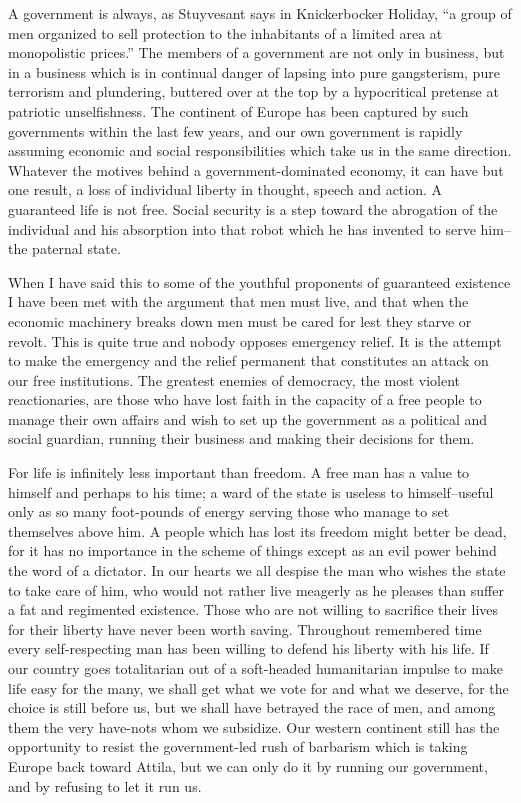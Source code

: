 \documentclass[9pt,twoside]{extarticle}
\begin{document}
A government is always, as Stuyvesant says in Knickerbocker Holiday, ``a group of men organized to sell protection to the inhabitants of a limited area at monopolistic prices.'' The members of a government are not only in business, but in a business which is in continual danger of lapsing into pure gangsterism, pure terrorism and plundering, buttered over at the top by a hypocritical pretense at patriotic unselfishness. The continent of Europe has been captured by such governments within the last few years, and our own government is rapidly assuming economic and social responsibilities which take us in the same direction. Whatever the motives behind a government-dominated economy, it can have but one result, a loss of individual liberty in thought, speech and action. A guaranteed life is not free. Social security is a step toward the abrogation of the individual and his absorption into that robot which he has invented to serve him--the paternal state.

When I have said this to some of the youthful proponents of guaranteed existence I have been met with the argument that men must live, and that when the economic machinery breaks down men must be cared for lest they starve or revolt. This is quite true and nobody opposes emergency relief. It is the attempt to make the emergency and the relief permanent that constitutes an attack on our free institutions. The greatest enemies of democracy, the most violent reactionaries, are those who have lost faith in the capacity of a free people to manage their own affairs and wish to set up the government as a political and social guardian, running their business and making their decisions for them.

For life is infinitely less important than freedom. A free man has a value to himself and perhaps to his time; a ward of the state is useless to himself--useful only as so many foot-pounds of energy serving those who manage to set themselves above him. A people which has lost its freedom might better be dead, for it has no importance in the scheme of things except as an evil power behind the word of a dictator. In our hearts we all despise the man who wishes the state to take care of him, who would not rather live meagerly as he pleases than suffer a fat and regimented existence. Those who are not willing to sacrifice their lives for their liberty have never been worth saving. Throughout remembered time every self-respecting man has been willing to defend his liberty with his life. If our country goes totalitarian out of a soft-headed humanitarian impulse to make life easy for the many, we shall get what we vote for and what we deserve, for the choice is still before us, but we shall have betrayed the race of men, and among them the very have-nots whom we subsidize. Our western continent still has the opportunity to resist the government-led rush of barbarism which is taking Europe back toward Attila, but we can only do it by running our government, and by refusing to let it run us.
\end{document}
